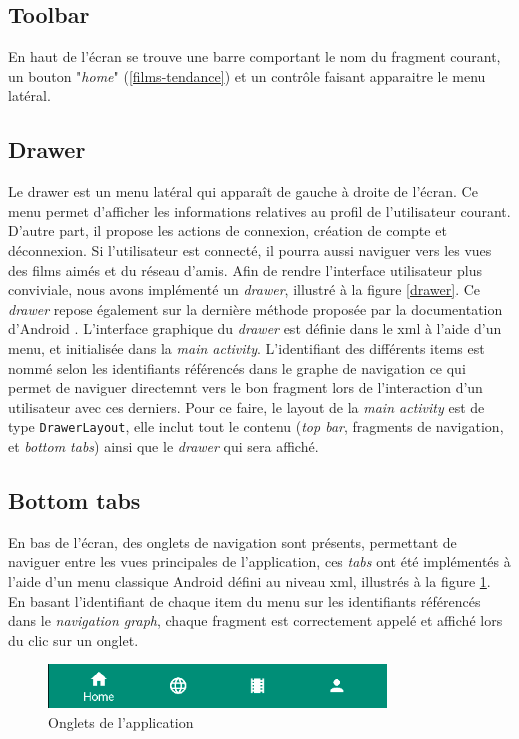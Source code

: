 \subsection{Toolbar}
En haut de l'écran se trouve une barre comportant le nom du fragment courant, un bouton "\textit{home}" (\ref{films-tendance}) et un contrôle faisant apparaitre le menu latéral.

\subsection{Drawer}
Le drawer est un menu latéral qui apparaît de gauche à droite de l'écran. Ce menu permet d'afficher les informations relatives au profil de l'utilisateur courant. D'autre part, il propose les actions de connexion, création de compte et déconnexion. Si l'utilisateur est connecté, il pourra aussi naviguer vers les vues des films aimés et du réseau d'amis.
Afin de rendre l'interface utilisateur plus conviviale, nous avons implémenté un \textit{drawer}, illustré à la figure \ref{drawer}. Ce \textit{drawer} repose également sur la dernière méthode proposée par la documentation d'Android \cite{docandroid}. L'interface graphique du \textit{drawer} est définie dans le \acrshort{xml} à l'aide d'un menu, et initialisée dans la \textit{main activity}. L'identifiant des différents items est nommé selon les identifiants référencés dans le graphe de navigation ce qui permet de naviguer directemnt vers le bon fragment lors de l'interaction d'un utilisateur avec ces derniers. Pour ce faire, le layout de la \textit{main activity} est de type \texttt{DrawerLayout}, elle inclut tout le contenu (\textit{top bar}, fragments de navigation, et \textit{bottom tabs}) ainsi que le \textit{drawer} qui sera affiché.

\subsection{Bottom tabs}
En bas de l'écran, des onglets de navigation sont présents, permettant de naviguer entre les vues principales de l'application, ces \textit{tabs} ont été implémentés à l'aide d'un menu classique Android défini au niveau \acrshort{xml}, illustrés à la figure \ref{tabs}. En basant l'identifiant de chaque item du menu sur les identifiants référencés dans le \textit{navigation graph}, chaque fragment est correctement appelé et affiché lors du clic sur un onglet.

\begin{figure}
    \begin{center}
        \includegraphics[width=0.8\textwidth]{img/screenshots/Bottom_Tabs.png}
    \end{center}
    \caption{Onglets de l'application}
    \label{tabs}
\end{figure}

